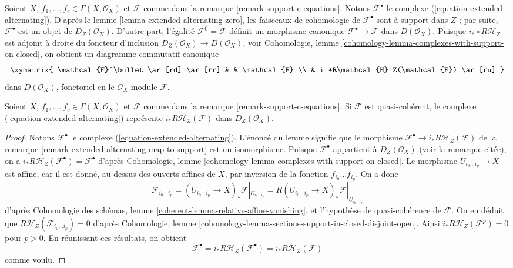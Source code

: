 \begin{remark}
\label{remark-extended-alternating-map-to-support}
Soient $X$, $f_1, \ldots, f_c \in \Gamma(X, \mathcal{O}_X)$ et
$\mathcal{F}$ comme dans la remarque \ref{remark-support-c-equations}.
Notons $\mathcal{F}^\bullet$ le complexe
(\ref{equation-extended-alternating}). D'après
le lemme \ref{lemma-extended-alternating-zero},
les faisceaux de cohomologie de $\mathcal{F}^\bullet$
sont à support dans $Z$ ; par suite, $\mathcal{F}^\bullet$ est un objet de
$D_Z(\mathcal{O}_X)$. D'autre part, l'égalité
$\mathcal{F}^0 = \mathcal{F}$ définit un morphisme canonique
$\mathcal{F}^\bullet \to \mathcal{F}$ dans $D(\mathcal{O}_X)$.
Puisque $i_* \circ R\mathcal{H}_Z$ est adjoint à droite du
foncteur d'inclusion $D_Z(\mathcal{O}_X) \to D(\mathcal{O}_X)$, voir
Cohomologie, lemme \ref{cohomology-lemma-complexes-with-support-on-closed},
on obtient un diagramme commutatif canonique
$$
\xymatrix{
\mathcal{F}^\bullet \ar[rd] \ar[rr] & & \mathcal{F} \\
& i_*R\mathcal{H}_Z(\mathcal{F}) \ar[ru]
}
$$
dans $D(\mathcal{O}_X)$, fonctoriel en le $\mathcal{O}_X$-module $\mathcal{F}$.
\end{remark}

\begin{lemma}
\label{lemma-extended-alternating-represented}
Soient $X$, $f_1, \ldots, f_c \in \Gamma(X, \mathcal{O}_X)$ et
$\mathcal{F}$ comme dans la remarque \ref{remark-support-c-equations}.
Si $\mathcal{F}$ est quasi-cohérent, le complexe
(\ref{equation-extended-alternating}) représente
$i_* R\mathcal{H}_Z(\mathcal{F})$ dans $D_Z(\mathcal{O}_X)$.
\end{lemma}

\begin{proof}
Notons $\mathcal{F}^\bullet$ le complexe
(\ref{equation-extended-alternating}).
L'énoncé du lemme signifie que le morphisme
$\mathcal{F}^\bullet \to i_*R\mathcal{H}_Z(\mathcal{F})$
de la remarque \ref{remark-extended-alternating-map-to-support}
est un isomorphisme. Puisque $\mathcal{F}^\bullet$ appartient à
$D_Z(\mathcal{O}_X)$ (voir la remarque citée), on a
$i_*R\mathcal{H}_Z(\mathcal{F}^\bullet) = \mathcal{F}^\bullet$
d'après Cohomologie, lemme \ref{cohomology-lemma-complexes-with-support-on-closed}.
Le morphisme $U_{i_0 \ldots i_p} \to X$ est affine,
car il est donné, au-dessus des ouverts affines de $X$, par inversion de la fonction
$f_{i_0} \ldots f_{i_p}$. On a donc
$$
\mathcal{F}_{i_0 \ldots i_p} =
(U_{i_0 \ldots i_p} \to X)_*\mathcal{F}|_{U_{i_0 \ldots i_p}} =
R(U_{i_0 \ldots i_p} \to X)_*\mathcal{F}|_{U_{i_0 \ldots i_p}}
$$
d'après Cohomologie des schémas, lemme \ref{coherent-lemma-relative-affine-vanishing},
et l'hypothèse de quasi-cohérence de $\mathcal{F}$. On en déduit que
$R\mathcal{H}_Z(\mathcal{F}_{i_0 \ldots i_p}) = 0$ d'après Cohomologie, lemme
\ref{cohomology-lemma-sections-support-in-closed-disjoint-open}.
Ainsi $i_*R\mathcal{H}_Z(\mathcal{F}^p) = 0$ pour $p > 0$.
En réunissant ces résultats, on obtient
$$
\mathcal{F}^\bullet = i_*R\mathcal{H}_Z(\mathcal{F}^\bullet) =
i_*R\mathcal{H}_Z(\mathcal{F})
$$
comme voulu.
\end{proof}

